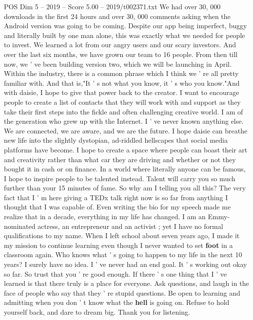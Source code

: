 \begin{textsample}{POS Dim 5 – 2019 – Score 5.00 – 2019/t002371.txt}
We had over 30, 000 downloads in the first 24 hours and over 30, 000 comments asking when the Android version was going to be coming.
Despite our app being imperfect, buggy and literally built by one man alone, this was exactly what we needed for people to invest.
We learned a lot from our angry users and our scary investors.
And over the last six months, we have grown our team to 16 people.
From then till now, we ' ve been building version two, which we will be launching in April.
Within the industry, there is a common phrase which I think we ' re all pretty familiar with.
And that is,"It ' s not what you know, it ' s who you know."And with daisie, I hope to give that power back to the creator.
I want to encourage people to create a list of contacts that they will work with and support as they take their first steps into the fickle and often challenging creative world.
I am of the generation who grew up with the Internet.
I ' ve never known anything else.
We are connected, we are aware, and we are the future.
I hope daisie can breathe new life into the slightly dystopian, ad-riddled hellscapes that social media platforms have become.
I hope to create a space where people can boast their art and creativity rather than what car they are driving and whether or not they bought it in cash or on finance.
In a world where literally anyone can be famous, I hope to inspire people to be talented instead.
Talent will carry you so much further than your 15 minutes of fame.
So why am I telling you all this?
The very fact that I ' m here giving a TEDx talk right now is so far from anything I thought that I was capable of.
Even writing the bio for my speech made me realize that in a decade, everything in my life has changed.
I am an Emmy-nominated actress, an entrepreneur and an activist ; yet I have no formal qualifications to my name.
When I left school about seven years ago, I made it my mission to continue learning even though I never wanted to set \textbf{foot} in a classroom again.
Who knows what ' s going to happen to my life in the next 10 years?
I surely have no idea.
I ' ve never had an end goal.
It ' s working out okay so far.
So trust that you ' re good enough.
If there ' s one thing that I ' ve learned is that there truly is a place for everyone.
Ask questions, and laugh in the face of people who say that they ' re stupid questions.
Be open to learning and admitting when you don ' t know what the \textbf{hell} is going on.
Refuse to hold yourself back, and dare to dream big.
Thank you for listening.

\end{textsample}
